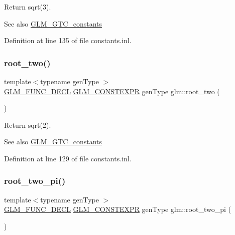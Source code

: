 Return sqrt(3). \begin{DoxySeeAlso}{See also}
\mbox{\hyperlink{group__gtc__constants}{G\+L\+M\+\_\+\+G\+T\+C\+\_\+constants}} 
\end{DoxySeeAlso}


Definition at line 135 of file constants.\+inl.

\mbox{\label{group__gtc__constants_ga74e607d29020f100c0d0dc46ce2ca950}} 
\subsubsection{\texorpdfstring{root\_two()}{root\_two()}}
{\footnotesize\ttfamily template$<$typename gen\+Type $>$ \\
\mbox{\hyperlink{setup_8hpp_ab2d052de21a70539923e9bcbf6e83a51}{G\+L\+M\+\_\+\+F\+U\+N\+C\+\_\+\+D\+E\+CL}} \mbox{\hyperlink{setup_8hpp_a08b807947b47031d3a511f03f89645ad}{G\+L\+M\+\_\+\+C\+O\+N\+S\+T\+E\+X\+PR}} gen\+Type glm\+::root\+\_\+two (\begin{DoxyParamCaption}{ }\end{DoxyParamCaption})}

Return sqrt(2). \begin{DoxySeeAlso}{See also}
\mbox{\hyperlink{group__gtc__constants}{G\+L\+M\+\_\+\+G\+T\+C\+\_\+constants}} 
\end{DoxySeeAlso}


Definition at line 129 of file constants.\+inl.

\mbox{\label{group__gtc__constants_ga2bcedc575039fe0cd765742f8bbb0bd3}} 
\subsubsection{\texorpdfstring{root\_two\_pi()}{root\_two\_pi()}}
{\footnotesize\ttfamily template$<$typename gen\+Type $>$ \\
\mbox{\hyperlink{setup_8hpp_ab2d052de21a70539923e9bcbf6e83a51}{G\+L\+M\+\_\+\+F\+U\+N\+C\+\_\+\+D\+E\+CL}} \mbox{\hyperlink{setup_8hpp_a08b807947b47031d3a511f03f89645ad}{G\+L\+M\+\_\+\+C\+O\+N\+S\+T\+E\+X\+PR}} gen\+Type glm\+::root\+\_\+two\+\_\+pi (\begin{DoxyParamCaption}{ }\end{DoxyParamCaption})}

